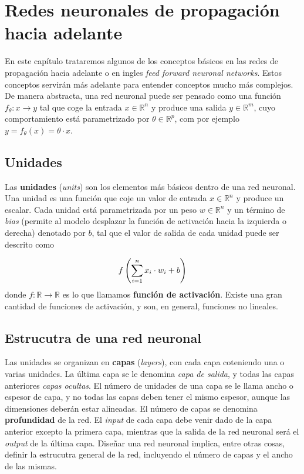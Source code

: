 \chapter{Redes neuronales de propagación hacia adelante}

En este capítulo trataremos algunos de los conceptos básicos en las redes de propagación hacia adelante o en ingles \textit{feed forward neuronal networks}. Estos conceptos servirán más adelante para entender conceptos mucho más complejos. De manera abstracta, una red neuronal puede ser pensado como una función $f_{\theta}: x \to y$ tal que coge la entrada $x\in \mathbb{R}^n$ y produce una salida $y\in \mathbb{R}^m$, cuyo comportamiento está parametrizado por $\theta \in \mathbb{R}^p$, com por ejemplo $y=f_\theta(x) = \theta \cdot x$. 

\section{Unidades}

Las \textbf{unidades} (\textit{units}) son los elementos más básicos dentro de una red neuronal. Una unidad es una función que coje un valor de entrada $x\in \mathbb{R}^n$ y produce un escalar. Cada unidad está parametrizada por un peso $w \in \mathbb{R}^n$ y un término de \textit{bias} (permite al modelo desplazar la función de activación hacia la izquierda o derecha) denotado por $b$, tal que el valor de salida de cada unidad puede ser descrito como

\begin{equation}
    f\left( \sum_{i=1}^n x_i \cdot w_i + b \right)
\end{equation}
donde $f:\mathbb{R} \to \mathbb{R}$ es lo que llamamos \textbf{función de activación}. Existe una gran cantidad de funciones de activación, y son, en general, funciones no lineales. 



\section{Estrucutra de una red neuronal}

Las unidades se organizan en \textbf{capas} (\textit{layers}), con cada capa coteniendo una o varias unidades. La última capa se le denomina \textit{capa de salida}, y todas las capas anteriores \textit{capas ocultas}. El número de unidades de una capa se le llama ancho o espesor de capa, y no todas las capas deben tener el mismo espesor, aunque las dimensiones deberán estar alineadas. El número de capas se denomina \textbf{profundidad} de la red. El \textit{input} de cada capa debe venir dado de la capa anterior excepto la primera capa, mientras que la salida de la red neuronal será el \textit{output} de la última capa. Diseñar una red neuronal implica, entre otras cosas, definir la estrucutra general de la red, incluyendo el número de capas y el ancho de las mismas.

